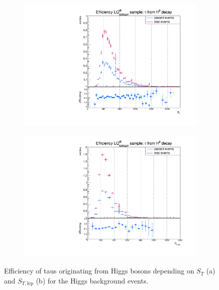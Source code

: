 %
\begin{figure}
  \centering
                \begin{subfigure}[t]{0.49\textwidth}
                \includegraphics[width=\textwidth]{figures/plots/ttH/Divided_fromHST.pdf}
                \label{Divided:fromH:ST}
                \end{subfigure}
                \begin{subfigure}[t]{0.49\textwidth}
                \includegraphics[width=\textwidth]{figures/plots/ttH/Divided_fromHSTlep.pdf}
                \label{Divided:fromH:STlep}
                \end{subfigure}
\caption[Efficiency of taus originating from Higgs bosons for the Higgs background events.]{Efficiency of taus originating from Higgs bosons depending on $S_{T}$ (a) and $S_{T,\text{lep}}$ (b) for the Higgs background events.}
\label{Divided:fromH:STgedöns}
\end{figure}

